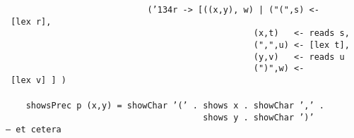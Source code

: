 \mbox{\tt \ \ \ \ \ \ \ \ \ \ \ \ \ \ \ \ \ \ \ \ \ \ \ \ \ \ \ \ ({\char'134}r\ ->\ [((x,y),\ w)\ |\ ("(",s)\ <-\ [lex\ r],}\\
\mbox{\tt \ \ \ \ \ \ \ \ \ \ \ \ \ \ \ \ \ \ \ \ \ \ \ \ \ \ \ \ \ \ \ \ \ \ \ \ \ \ \ \ \ \ \ \ \ \ \ \ \ (x,t)\ \ \ <-\ reads\ s,}\\
\mbox{\tt \ \ \ \ \ \ \ \ \ \ \ \ \ \ \ \ \ \ \ \ \ \ \ \ \ \ \ \ \ \ \ \ \ \ \ \ \ \ \ \ \ \ \ \ \ \ \ \ \ (",",u)\ <-\ [lex\ t],}\\
\mbox{\tt \ \ \ \ \ \ \ \ \ \ \ \ \ \ \ \ \ \ \ \ \ \ \ \ \ \ \ \ \ \ \ \ \ \ \ \ \ \ \ \ \ \ \ \ \ \ \ \ \ (y,v)\ \ \ <-\ reads\ u}\\
\mbox{\tt \ \ \ \ \ \ \ \ \ \ \ \ \ \ \ \ \ \ \ \ \ \ \ \ \ \ \ \ \ \ \ \ \ \ \ \ \ \ \ \ \ \ \ \ \ \ \ \ \ (")",w)\ <-\ [lex\ v]\ ]\ )}\\
\mbox{\tt }\\
\mbox{\tt \ \ \ \ showsPrec\ p\ (x,y)\ =\ showChar\ '('\ .\ shows\ x\ .\ showChar\ ','\ .}\\
\mbox{\tt \ \ \ \ \ \ \ \ \ \ \ \ \ \ \ \ \ \ \ \ \ \ \ \ \ \ \ \ \ \ \ \ \ \ \ \ \ \ \ shows\ y\ .\ showChar\ ')'}\\
\mbox{\tt --\ et\ cetera}\\
\mbox{\tt }
\eprogB
